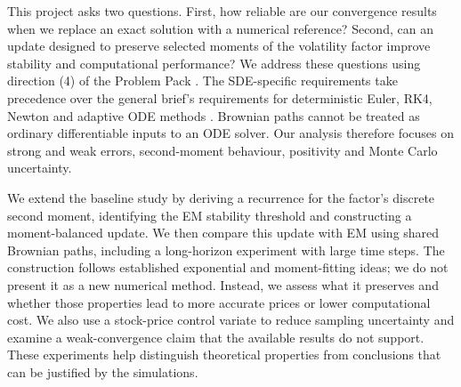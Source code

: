 This project asks two questions. First, how reliable are our convergence results when we replace an exact solution with a numerical reference? Second, can an update designed to preserve selected moments of the volatility factor improve stability and computational performance? We address these questions using direction (4) of the Problem Pack \cite{pack}. The SDE-specific requirements take precedence over the general brief's requirements for deterministic Euler, RK4, Newton and adaptive ODE methods \cite{brief}. Brownian paths cannot be treated as ordinary differentiable inputs to an ODE solver. Our analysis therefore focuses on strong and weak errors, second-moment behaviour, positivity and Monte Carlo uncertainty.

We extend the baseline study by deriving a recurrence for the factor's discrete second moment, identifying the EM stability threshold and constructing a moment-balanced update. We then compare this update with EM using shared Brownian paths, including a long-horizon experiment with large time steps. The construction follows established exponential and moment-fitting ideas; we do not present it as a new numerical method. Instead, we assess what it preserves and whether those properties lead to more accurate prices or lower computational cost. We also use a stock-price control variate to reduce sampling uncertainty and examine a weak-convergence claim that the available results do not support. These experiments help distinguish theoretical properties from conclusions that can be justified by the simulations.

